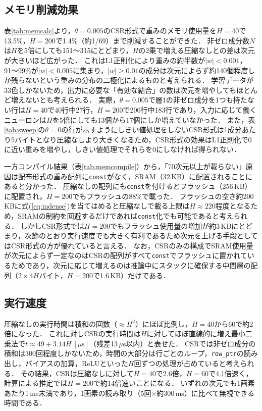 \documentclass[a4paper,11pt,uplatex,dvipdfmx]{jsarticle}
\begin{document}
\subsection{メモリ削減効果}
\label{sec:disc_mem}
表\ref{tab:memcalc}より，$\theta=0.005$のCSR形式で重みのメモリ使用量を$H=40$で13.5\%，$H=200$で1.4\%（約1/69）まで削減することができた．
非ゼロ成分数$N$は$H$を5倍にしても151〜315にとどまり，$H$の2乗で増える圧縮なしとの差は次元が大きいほど広がった．
これはL1正則化により重みの約半数が$|w|<0.001$，91〜99\%が$|w|<0.005$に集まり，$|w|\geq 0.01$の成分は次元によらず約140個程度しか残らないという重みの分布の二極化によるものと考えられる．
学習データが33色しかないため，出力に必要な「有効な結合」の数は次元を増やしてもほとんど増えないとも考えられる．
実際，$\theta=0.005$で層1の非ゼロ成分を1つも持たない行は$H=40$で40行中27行，$H=200$で200行中183行であり，入力に応じて働くニューロンは$H$を5倍にしても13個から17個にしか増えていなかった．
また，表\ref{tab:sweep}の$\theta=0$の行が示すようにしきい値処理をしないCSR形式は1成分あたり5バイトとなり圧縮なしより大きくなるため，CSR形式の効果はL1正則化で0に近い重みを増やし，しきい値処理でそれらを0にしなければ得られない．

一方コンパイル結果（表\ref{tab:memcompile}）から，「70次元以上が載らない」原因は配布形式の重み配列に\texttt{const}がなく，SRAM（32\,KB）に配置されることにあると分かった．
圧縮なしの配列にも\texttt{const}を付けるとフラッシュ（256\,KB）に配置され，$H=200$でもフラッシュの88\%で載った．
フラッシュの空き約200\,KBに式(\ref{eq:mdense})を当てはめると圧縮なしで載る上限は$H \approx 220$程度となるため，SRAMの制約を回避するだけであれば\texttt{const}化でも可能であると考えられる．
しかしCSR形式では$H=200$でもフラッシュ使用量の増加が約3\,KBにとどまり，次節のとおり実行速度でも大きく有利であるため次元を上げる手段としてはCSR形式の方が優れていると言える．
なお，CSRのみの構成でSRAM使用量が次元によらず一定なのはCSRの配列がすべて\texttt{const}でフラッシュに置かれているためであり，次元に応じて増えるのは推論中にスタックに確保する中間層の配列（$2 \times 4H$バイト，$H=200$で1.6\,KB）だけである．

\subsection{実行速度}
圧縮なしの実行時間は積和の回数（$\approx H^2$）にほぼ比例し，$H=40$から60で約2倍になった．
これに対しCSRの実行時間は$H$に対してほぼ直線的に増え最小二乗法で$t \approx 49 + 3.14H\ [\mu\mathrm{s}]$（残差13\,$\mu$s以内）と表せた．
CSRでは非ゼロ成分の積和は300回程度しかないため，時間の大部分は行ごとのループ，\texttt{row\_ptr}の読み出し，バイアスの加算，ReLUといった$H$回ずつの処理が占めていると考えられる．
その結果，CSRは圧縮なしに対して$H=40$で2.6倍，$H=60$で4.1倍速く，計算による推定では$H=200$で約14倍速いことになる．
いずれの次元でも1画素あたり1\,ms未満であり，1画素の読み取り（5回$\times$約300\,ms）に比べて無視できる時間である．
\end{document}
